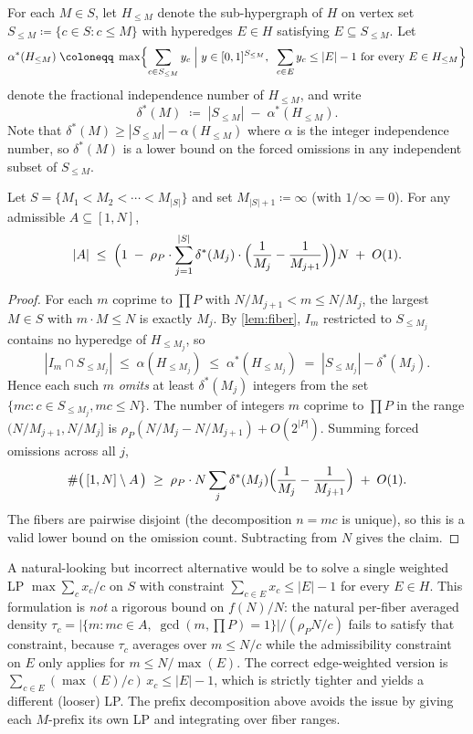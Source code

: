 \documentclass{amsart}
\begin{document}
For each $M \in S$, let $H_{\leq M}$ denote the sub-hypergraph of $H$ on vertex
set $S_{\leq M} \coloneqq \{c \in S : c \leq M\}$ with hyperedges
$E \in H$ satisfying $E \subseteq S_{\leq M}$. Let
\[
    \alpha^*(H_{\leq M}) \;\coloneqq\; \max\Bigl\{ \sum_{c \in S_{\leq M}} y_c \;\Big|\; y \in [0, 1]^{S_{\leq M}},\;\; \sum_{c \in E} y_c \leq |E|-1 \text{ for every } E \in H_{\leq M} \Bigr\}
\]
denote the fractional independence number of $H_{\leq M}$, and write
\[
    \delta^*(M) \;\coloneqq\; |S_{\leq M}| \;-\; \alpha^*(H_{\leq M}).
\]
Note that $\delta^*(M) \geq |S_{\leq M}| - \alpha(H_{\leq M})$ where $\alpha$ is the integer independence number, so $\delta^*(M)$ is a lower bound on the forced omissions in any independent subset of $S_{\leq M}$.

\begin{lemma}\label{lem:prefix-counting}
Let $S = \{M_1 < M_2 < \cdots < M_{|S|}\}$ and set $M_{|S|+1} \coloneqq \infty$ (with $1/\infty = 0$). For any admissible $A \subseteq [1, N]$,
\[
    |A| \;\leq\; \Bigl(1 \;-\; \rho_P \cdot \sum_{j=1}^{|S|} \delta^*(M_j) \cdot \Bigl(\frac{1}{M_j} - \frac{1}{M_{j+1}}\Bigr)\Bigr) N \;+\; O(1).
\]
\end{lemma}

\begin{proof}
For each $m$ coprime to $\prod P$ with $N/M_{j+1} < m \leq N/M_j$, the largest $M \in S$ with $m \cdot M \leq N$ is exactly $M_j$. By \cref{lem:fiber}, $I_m$ restricted to $S_{\leq M_j}$ contains no hyperedge of $H_{\leq M_j}$, so
\[
    |I_m \cap S_{\leq M_j}| \;\leq\; \alpha(H_{\leq M_j}) \;\leq\; \alpha^*(H_{\leq M_j}) \;=\; |S_{\leq M_j}| - \delta^*(M_j).
\]
Hence each such $m$ \emph{omits} at least $\delta^*(M_j)$ integers from the set $\{m c : c \in S_{\leq M_j}, m c \leq N\}$. The number of integers $m$ coprime to $\prod P$ in the range $(N/M_{j+1}, N/M_j]$ is $\rho_P (N/M_j - N/M_{j+1}) + O(2^{|P|})$. Summing forced omissions across all $j$,
\[
    \#\bigl(\,[1, N] \setminus A\,\bigr) \;\geq\; \rho_P \cdot N \sum_{j} \delta^*(M_j) \Bigl(\frac{1}{M_j} - \frac{1}{M_{j+1}}\Bigr) \;+\; O(1).
\]
The fibers are pairwise disjoint (the decomposition $n = mc$ is unique), so this is a valid lower bound on the omission count. Subtracting from $N$ gives the claim.
\end{proof}

\begin{remark}\label{rem:not-weighted-LP}
A natural-looking but incorrect alternative would be to solve a single
weighted LP $\max \sum_c x_c / c$ on $S$ with constraint
$\sum_{c \in E} x_c \le |E| - 1$ for every $E \in H$. This formulation is
\emph{not} a rigorous bound on $f(N)/N$: the natural per-fiber averaged
density $\tau_c = |\{m : mc \in A,\; \gcd(m, \prod P) = 1\}|/(\rho_P N/c)$
fails to satisfy that constraint, because $\tau_c$ averages over
$m \le N/c$ while the admissibility constraint on $E$ only applies for
$m \le N/\max(E)$. The correct edge-weighted version is
$\sum_{c \in E}(\max(E)/c)\, x_c \le |E|-1$, which is strictly tighter
and yields a different (looser) LP. The prefix decomposition above avoids
the issue by giving each $M$-prefix its own LP and integrating over
fiber ranges.
\end{remark}
\end{document}
